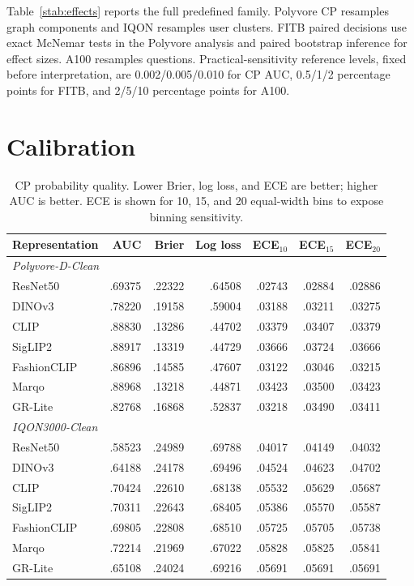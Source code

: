 \documentclass[pdflatex,sn-mathphys-num,iicol]{sn-jnl}
\begin{document}
Table~\ref{stab:effects} reports the full predefined family. Polyvore CP resamples graph components and IQON resamples user clusters. FITB paired decisions use exact McNemar tests in the Polyvore analysis and paired bootstrap inference for effect sizes. A100 resamples questions. Practical-sensitivity reference levels, fixed before interpretation, are 0.002/0.005/0.010 for CP AUC, 0.5/1/2 percentage points for FITB, and 2/5/10 percentage points for A100.

\section{Calibration}

\begin{table}[t]
\caption{CP probability quality. Lower Brier, log loss, and ECE are better; higher AUC is better. ECE is shown for 10, 15, and 20 equal-width bins to expose binning sensitivity.}
\label{stab:calibration}
\centering\small
\setlength{\tabcolsep}{5pt}\renewcommand{\arraystretch}{1.04}
\begin{tabular}{lrrrrrr}
\toprule
Representation & AUC & Brier & Log loss & ECE$_{10}$ & ECE$_{15}$ & ECE$_{20}$ \\
\midrule
\multicolumn{7}{l}{\textit{Polyvore-D-Clean}} \\
ResNet50 & .69375 & .22322 & .64508 & .02743 & .02884 & .02886 \\
DINOv3 & .78220 & .19158 & .59004 & .03188 & .03211 & .03275 \\
CLIP & .88830 & .13286 & .44702 & .03379 & .03407 & .03379 \\
SigLIP2 & .88917 & .13319 & .44729 & .03666 & .03724 & .03666 \\
FashionCLIP & .86896 & .14585 & .47607 & .03122 & .03046 & .03215 \\
Marqo & .88968 & .13218 & .44871 & .03423 & .03500 & .03423 \\
GR-Lite & .82768 & .16868 & .52837 & .03218 & .03490 & .03411 \\
\midrule
\multicolumn{7}{l}{\textit{IQON3000-Clean}} \\
ResNet50 & .58523 & .24989 & .69788 & .04017 & .04149 & .04032 \\
DINOv3 & .64188 & .24178 & .69496 & .04524 & .04623 & .04702 \\
CLIP & .70424 & .22610 & .68138 & .05532 & .05629 & .05687 \\
SigLIP2 & .70311 & .22643 & .68405 & .05386 & .05570 & .05587 \\
FashionCLIP & .69805 & .22808 & .68510 & .05725 & .05705 & .05738 \\
Marqo & .72214 & .21969 & .67022 & .05828 & .05825 & .05841 \\
GR-Lite & .65108 & .24024 & .69216 & .05691 & .05691 & .05691 \\
\bottomrule
\end{tabular}
\end{table}
\end{document}
